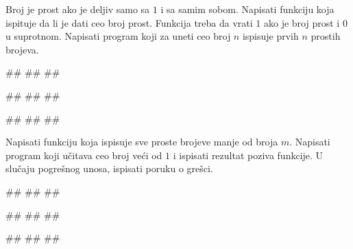 \begin{Exercise}[label=v1.4_08] 
Broj je prost ako je deljiv samo sa $1$ i sa samim sobom. Napisati
funkciju  koja ispituje da li je dati ceo
broj prost. Funkcija treba da vrati $1$ ako je broj prost i $0$ u
suprotnom. Napisati program koji za uneti ceo broj
$n$ ispisuje prvih $n$ prostih brojeva.

\begin{miditest}
\begin{upotreba}{1}
#\naslovInt#
##
##
\end{upotreba}
\end{miditest}
\begin{miditest}
\begin{upotreba}{2}
#\naslovInt#
##
##
\end{upotreba}
\end{miditest}

\begin{miditest}
\begin{upotreba}{3}
#\naslovInt#
##
##
\end{upotreba}
\end{miditest}

\end{Exercise}
\begin{Answer}[ref=v1.4_08]
\end{Answer}

\begin{Exercise}[label=p1.4_] 
Napisati funkciju  koja ispisuje
sve proste brojeve manje od broja $m$.  Napisati program koji učitava
ceo broj veći od $1$ i ispisati rezultat poziva funkcije. U slučaju
pogrešnog unosa, ispisati poruku o grešci. %
 
\begin{miditest}
\begin{upotreba}{1}
#\naslovInt#
##
##
\end{upotreba}
\end{miditest}
\begin{miditest}
\begin{upotreba}{2}
#\naslovInt#
##
##
\end{upotreba}
\end{miditest}

\begin{miditest}
\begin{upotreba}{3}
#\naslovInt#
##
##
\end{upotreba}
\end{miditest}

\end{Exercise}



